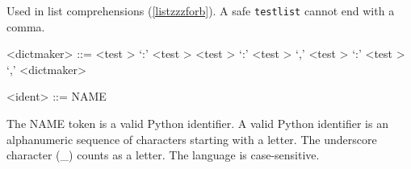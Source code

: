 
Used in list comprehensions (\ref{listzzzforb}).  A safe \verb|testlist| cannot end with a comma.

\label{dictmakerb}

\begin{grammar}
<dictmaker> ::= <test \myref[testb]> `:' <test \myref[testb]>
	\alt <test \myref[testb]> `:' <test \myref[testb]> `,'
	\alt <test \myref[testb]> `:' <test \myref[testb]> `,' <dictmaker>
\end{grammar}


\label{identb}

\begin{grammar}
<ident> ::= NAME
\end{grammar}


The NAME token is a valid Python identifier.  A valid Python identifier is an alphanumeric sequence of characters starting with a letter.  The underscore character (\_) counts as a letter.  The language is case-sensitive.
